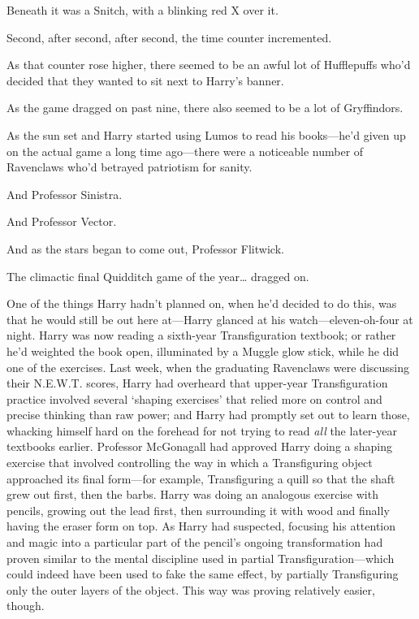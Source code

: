 Beneath it was a Snitch, with a blinking red X over it.

\later

Second, after second, after second, the time counter incremented.

As that counter rose higher, there seemed to be an awful lot of Hufflepuffs who'd decided that they wanted to sit next to Harry's banner.

As the game dragged on past nine, there also seemed to be a lot of Gryffindors.

As the sun set and Harry started using Lumos to read his books—he'd given up on the actual game a long time ago—there were a noticeable number of Ravenclaws who'd betrayed patriotism for sanity.

And Professor Sinistra.

And Professor Vector.

And as the stars began to come out, Professor Flitwick.

The climactic final Quidditch game of the year{\ldots} dragged on.

\later

One of the things Harry hadn't planned on, when he'd decided to do this, was that he would still be out here at—Harry glanced at his watch—eleven-oh-four at night. Harry was now reading a sixth-year Transfiguration textbook; or rather he'd weighted the book open, illuminated by a Muggle glow stick, while he did one of the exercises. Last week, when the graduating Ravenclaws were discussing their N.E.W.T. scores, Harry had overheard that upper-year Transfiguration practice involved several `shaping exercises' that relied more on control and precise thinking than raw power; and Harry had promptly set out to learn those, whacking himself hard on the forehead for not trying to read \emph{all} the later-year textbooks earlier. Professor McGonagall had approved Harry doing a shaping exercise that involved controlling the way in which a Transfiguring object approached its final form—for example, Transfiguring a quill so that the shaft grew out first, then the barbs. Harry was doing an analogous exercise with pencils, growing out the lead first, then surrounding it with wood and finally having the eraser form on top. As Harry had suspected, focusing his attention and magic into a particular part of the pencil's ongoing transformation had proven similar to the mental discipline used in partial Transfiguration—which could indeed have been used to fake the same effect, by partially Transfiguring only the outer layers of the object. This way was proving relatively easier, though.

